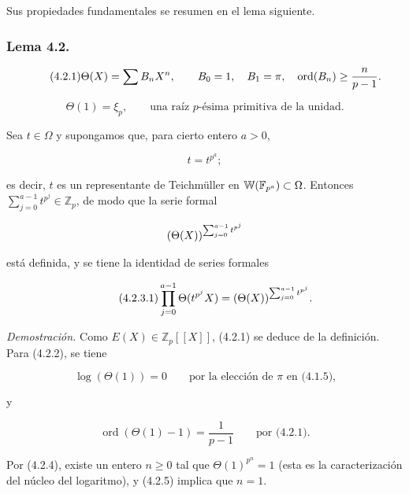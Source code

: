 Sus propiedades fundamentales se resumen en el lema siguiente.

\subsubsection*{Lema 4.2.}

\begin{equation}\tag{4.2.1}
\Theta(X)=\sum B_n X^n,\qquad B_0=1,\quad
\sisi{A_1}{B_1}=\pi,\quad
\operatorname{ord}(B_n)\geq\frac n{p-1}.
\end{equation}

\begin{equation}\tag{4.2.2}
\Theta(1)=\xi_p,\qquad\text{una raíz $p$-ésima primitiva de la unidad.}
\end{equation}

Sea $t\in\Omega$ y supongamos que, para cierto entero $a>0$,

\begin{equation}\tag{4.2.3}
t=t^{p^a};
\end{equation}

es decir, $t$ es un representante de Teichmüller en
$\mathbb W(\mathbb F_{\sisi{q^a}{p^a}})\subset\Omega$. Entonces
$\sum_{j=0}^{a-1}t^{p^j}\in\mathbb Z_p$, de modo que la serie formal

\pageoriginale

\[
(\Theta(X))^{\sum_{j=0}^{a-1}\sisi{t^j}{t^{p^j}}}
\]

está definida, y se tiene la identidad de series formales

\begin{equation}\tag{4.2.3.1}
\prod_{j=0}^{a-1}\Theta(t^{p^j}X)
=(\Theta(X))^{\sum_{j=0}^{a-1}\sisi{t^j}{t^{p^j}}}.
\end{equation}

\medskip
\noindent\emph{Demostración.}
Como $E(X)\in\mathbb Z_p[[X]]$, (4.2.1) se deduce de la definición. Para
(4.2.2), se tiene

\begin{equation}\tag{4.2.4}
\log(\Theta(1))=0
\qquad\text{por la elección de $\pi$ en (4.1.5),}
\end{equation}

y

\begin{equation}\tag{4.2.5}
\operatorname{ord}(\Theta(1)-1)=\frac1{p-1}
\qquad\text{por (4.2.1).}
\end{equation}

Por (4.2.4), existe un entero $n\geq0$ tal que
$\Theta(1)^{p^n}=1$ (esta es la caracterización del núcleo del logaritmo),
y (4.2.5) implica que $n=1$.

